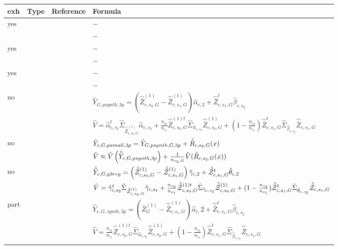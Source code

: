 \begin{table}
    \fontsize{8}{2}\selectfont
    \centering
\begin{tabular}{ l l r l}
	 exh 	&  Type	&  Reference & Formula\\ \toprule
     yes & \psynthetic{} & & $-$\\
 &  &  & $-$ \\
\lightrule
yes & \psmall{} &  & $-$\\
 &  &  & $-$\\
\lightrule
yes & \pextended{} &  & $-$\\
 &  &  & $-$\\
\strongrule

no 	&  \psynthetic{} 	& \analogy{} & $\hat{Y}_{G,psynth,3p} = \left( \hat{\bar{Z}}_{c,s_0,G}^{(1)}- \hat{\bar{Z}}_{c,s_1,G}^{(1)}\right) \hat{\alpha}_{c,2} + \hat{\bar{Z}}^t_{c,s_1,G}\hat{\beta}_{c,s_2} $\\
	   	&    	&    \analogy{} & $ \hat{V} = \hat{\alpha}_{c,s_2}^t \hat{\Sigma}_{\hat{\bar{Z}}_{c,s_0,G}^{(1)}} \hat{\alpha}_{c,s_2} + \frac{n_{s_2}}{n_{s_1}} \hat{\bar{Z}}^{(1)t}_{c,s_0,G} \hat{\Sigma}_{ \hat{\alpha}_{c,s_2}} \hat{\bar{Z}}^{(1)}_{c,s_0,G} + (1-\frac{n_{s_2}}{n_{s_1}})\hat{\bar{Z}}^{t}_{c,s_1,G} \hat{\Sigma}_{ \hat{\beta}_{c,s_2}} \hat{\bar{Z}}_{c,s_1,G} $\\
\lightrule
			
no 	&  \psmall{} 	& \analogy{} & $ \hat{Y}_{c,G,psmall,3p} = \hat{Y}_{G,psynth,G,3p} + \bar{\hat{R}}_{c,s_2,G}(x)$\\
	    	&      	& \analogy{} & $ \hat{V} \approx \hat{V}\left(\hat{\tilde{Y}}_{c,G,psynth,3p}\right) + \frac{1}{n_{s_2,G}}\hat{V}(\hat{R}_{c,s_2,G}(x))$\\
\lightrule

no 	&  \pextended{} 	& \cite[eq. 53]{Man13c.e} & $ \hat{\tilde{Y}}_{c,G,g3reg} = \left( \hat{\bar{\mathcal{Z}}}_{c,s_0,G}^{(1)}- \hat{\bar{\mathcal{Z}}}_{c,s_1,G}^{(1)}\right) \hat{\gamma}_{c,2} + \hat{\bar{\mathcal{Z}}}^t_{c,s_1,G}\hat{\theta}_{c,2}$\\
        &    	&     \cite[eq. 55]{Man13c.e} & $\hat{V} = \hat{\gamma}_{c,s_2}^t \hat{\Sigma}_{\hat{\bar{\mathcal{Z}}}_{c,s_0,G}^{(1)}} \hat{\gamma}_{c,s_2} + \frac{n_{s_2}}{n_{s_1}} \hat{\bar{\mathcal{Z}}}^{(1)t}_{c,s_0,G} \hat{\Sigma}_{ \hat{\gamma}_{c,s_2}} \hat{\bar{\mathcal{Z}}}^{(1)}_{c,s_0,G} + (1-\frac{n_{s_2}}{n_{s_1}})\hat{\bar{\mathcal{Z}}}^{t}_{c,s_1,G} \hat{\Sigma}_{ \hat{\theta}_{c,s_2}} \hat{\bar{\mathcal{Z}}}_{c,s_1,G} $\\
\strongrule
part 	&  \psynthetic{} 	& \analogy{} & $\hat{Y}_{c,G,synth,3p} = \left(
\bar{Z}_{G}^{(1)}- \hat{\bar{Z}}_{c,s_1,G}^{(1)}\right) \hat{\alpha}_{c,}2 + \hat{\bar{Z}}^t_{c,s_1,G}\hat{\beta}_{c,s_2} $\\
	   	&    	&    \analogy{} & $ \hat{V} = \frac{n_{s_2}}{n_{s_1}} \hat{\bar{Z}}^{(1)t}_{c,s_0,G} \hat{\Sigma}_{ \hat{\alpha}_{c,s_2}} \hat{\bar{Z}}^{(1)}_{c,s_0,G} + (1-\frac{n_{s_2}}{n_{s_1}})\hat{\bar{Z}}^{t}_{c,s_1,G} \hat{\Sigma}_{ \hat{\beta}_{c,s_2}} \hat{\bar{Z}}_{c,s_1,G} $\\
\lightrule
			

\end{tabular}
\end{table}
